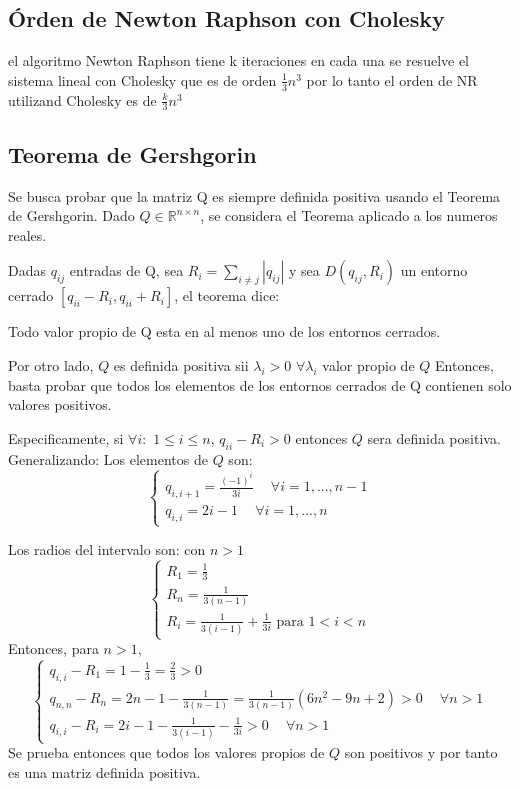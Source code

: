 \documentclass{endm}
\begin{document}
\subsection{Órden de Newton Raphson con Cholesky}
el algoritmo Newton Raphson tiene k iteraciones en cada una se resuelve el sistema lineal con Cholesky que es de orden $\frac{1}{3}n^{3}$  por lo tanto el orden de NR utilizand Cholesky es de  $\frac{k}{3}n^{3}$

\subsection{Teorema de Gershgorin}
Se busca probar que la matriz Q es siempre definida positiva usando el Teorema de Gershgorin.
Dado $Q \in \mathbb{R}^{n \times n}$, se considera el Teorema aplicado a los numeros reales.

Dadas $q_{ij}$ entradas de Q, sea $R_i = \sum_{i \neq j}\left | q_{ij} \right |$ y sea $D(q_{ij},R_i)$
un entorno cerrado $ [q_{ii}-R_i, q_{ii}+R_i]$, el teorema dice:
\begin{thm}
    Todo valor propio de Q esta en al menos uno de los entornos cerrados.
\end{thm}

Por otro lado, $Q$ es definida positiva sii $\lambda_i > 0$ $\forall \lambda_i$ valor propio de $Q$
Entonces, basta probar que todos los elementos de los entornos cerrados de Q contienen solo valores positivos.

Especificamente, si $\forall i:$ $1 \leq i \leq n$, $q_{ii} - R_i >0$ entonces $Q$ sera definida positiva.
Generalizando:
Los elementos de $Q$ son:
\begin{equation}
    \begin{cases}
        q_{i,i+1} = \frac{(-1)^i}{3i} \phantom{-} \forall i = 1,...,n-1 \\
        q_{i,i} = 2i-1 \phantom{-} \forall i = 1,...,n
    \end{cases}
\end{equation}

Los radios del intervalo son:
con $n > 1$
\begin{equation}
    \begin{cases}
        R_1 = \frac{1}{3} \\
        R_n = \frac{1}{3(n-1)} \\
        R_i = \frac{1}{3(i-1)} + \frac{1}{3i} \text{ para }  1<i<n
    \end{cases}
\end{equation}
Entonces, para $n > 1$,
\begin{equation}
    \begin{cases}
        q_{i,i} - R_1 = 1 - \frac{1}{3} = \frac{2}{3} > 0 \\
        q_{n,n} - R_n =  2n-1 - \frac{1}{3(n-1)} = \frac{1}{3(n-1)}(6n^2 - 9n + 2) > 0 \phantom{-}\forall n>1 \\
        q_{i,i} - R_i = 2i-1 - \frac{1}{3(i-1)} - \frac{1}{3i} > 0 \phantom{-}\forall n>1
    \end{cases}
\end{equation}
Se prueba entonces que todos los valores propios de $Q$ son positivos y por tanto es una matriz definida positiva.
\end{document}
